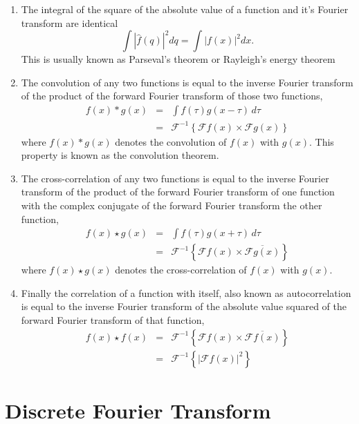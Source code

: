 \begin{enumerate}
\item The integral of the square of the absolute value of a function and it's Fourier transform are identical
\begin{equation}
\int |\hat{f}(q)|^2 dq = \int |f(x)|^2 dx.
\end{equation}
This is usually known as Parseval's theorem or Rayleigh's energy theorem

\item The convolution of any two functions is equal to the inverse Fourier transform of the product of the forward Fourier transform of those two functions,
\begin{eqnarray}
f(x) * g(x) & = & \int f(\tau) g(x-\tau) \, d\tau \nonumber \\
& = & \mathscr{F}^{-1}\left\{\mathscr{F}f(x) \times \mathscr{F}g(x)\right\}
\end{eqnarray}
where $f(x) * g(x)$ denotes the convolution of $f(x)$ with $g(x)$. This property
is known as the convolution theorem.

\item The cross-correlation of any two functions is equal to the inverse Fourier
  transform of the product of the forward Fourier transform of one function with
  the complex conjugate of the forward Fourier transform the other function,
\begin{eqnarray}
f(x) \star g(x) & = & \int f(\tau) g(x+\tau) \, d\tau \nonumber \\ 
& = & \mathscr{F}^{-1}\left\{\mathscr{F}f(x) \times \overline{\mathscr{F}g(x)}\right\}
\end{eqnarray}
where $f(x) \star g(x)$ denotes the cross-correlation of $f(x)$ with $g(x)$.
 
\item Finally the correlation of a function with itself, also known as
  autocorrelation is equal to the inverse Fourier transform of the absolute
  value squared of the forward Fourier transform of that function,
  \begin{eqnarray}
f(x) \star f(x) & = & \mathscr{F}^{-1}\left\{\mathscr{F}f(x) 
  \times \overline{\mathscr{F}f(x)}\right\} \nonumber \\
& = & \mathscr{F}^{-1}\left\{|\mathscr{F}f(x)|^2\right\}
\end{eqnarray}
\end{enumerate}

\section{Discrete Fourier Transform}

